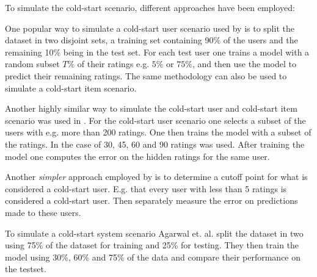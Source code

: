 To simulate the cold-start scenario, different approaches have been employed:

One popular way to simulate a cold-start user scenario used by \cite{Stern2009, Lam2008} is to split the dataset in two disjoint sets, a training set containing 90\% of the users and the remaining 10\% being in the test set. For each test user one trains a model with a random subset $T\%$ of their ratings e.g. $5\%$ or $75\%$, and then use the model to predict their remaining ratings. The same methodology can also be used to simulate a cold-start item scenario.

Another highly similar way to simulate the cold-start user and cold-start item scenario was used in \cite{Rashid2002, Rashid2008}. For the cold-start user scenario one selects a subset of the users with e.g. more than 200 ratings. One then trains the model with a subset of the ratings. In the case of \cite{Rashid2002} 30, 45, 60 and 90 ratings was used. After training the model one computes the error on the hidden ratings for the same user.

Another \emph{simpler} approach employed by \cite{Massa2007, Jamali2009} is to determine a cutoff point for what is considered a cold-start user. E.g. that every user with less than 5 ratings is considered a cold-start user. Then separately measure the error on predictions made to these users.

To simulate a cold-start system scenario Agarwal et. al. \cite{Agarwal2009} split the dataset in two using 75\% of the dataset for training and 25\% for testing. They then train the model using 30\%, 60\% and 75\% of the data and compare their performance on the testset.




